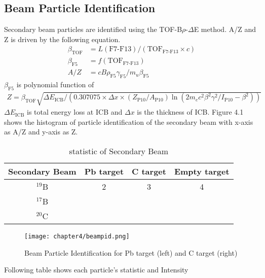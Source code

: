\subsection{Beam Particle Identification}
Secondary beam particles are identified using the TOF-B$\rho$-$\Delta$E method. A/Z and Z is driven by the following equation.
\begin{align}
    \beta_{\text{TOF}} &= L(\text{F7-F13}) / ( {\text{TOF}}_{\text{F7-F13}} \times c )\\
    \beta_{\text{F5}} &= f(\text{TOF}_{\text{F7-F13}})\\
    A/Z &= c B\rho_{\text{F5}} \gamma_{\text{F5}} / m_u \beta_{\text{F5}}
\end{align}
    $\beta_{\text{F5}}$ is polynomial function of 
\begin{align}
    Z = \beta_{\text{TOF}} \sqrt{\Delta E_{\text{ICB}} / ( 0.307075 \times \Delta x \times (Z_{\text{P10}} / A_{\text{P10}} ) \ln(2m_{e}c^{2}\beta^{2}\gamma^{2}/ I_{\text{P10}} - \beta^{2}) )}
\end{align}
$\Delta E_{\text{ICB}}$ is total energy loss at ICB and $\Delta x$ is the thickness of ICB. 
Figure 4.1 shows the histogram of particle identification of the secondary beam with x-axis as A/Z and y-axis as Z. 
\begin{table}[h]
    \centering
    \begin{tabular}{cccc}
        \hline
        Secondary Beam & Pb target & C target & Empty target\\             
        \hline \hline
        ${}^{19}$B &  2&3  &4  \\
        ${}^{17}$B &  &  &  \\
        ${}^{20}$C &  &  &  \\
        \hline
    \end{tabular}
    \caption{statistic of Secondary Beam}
\end{table}

\begin{figure}[t]
    \centering
    \texttt{[image: chapter4/beampid.png]}
    \caption{Beam Particle Identification for Pb target (left) and C target (right)}
    \label{Beam Particle Identification}
\end{figure}

Following table shows each particle's statistic and Intensity

\clearpage
